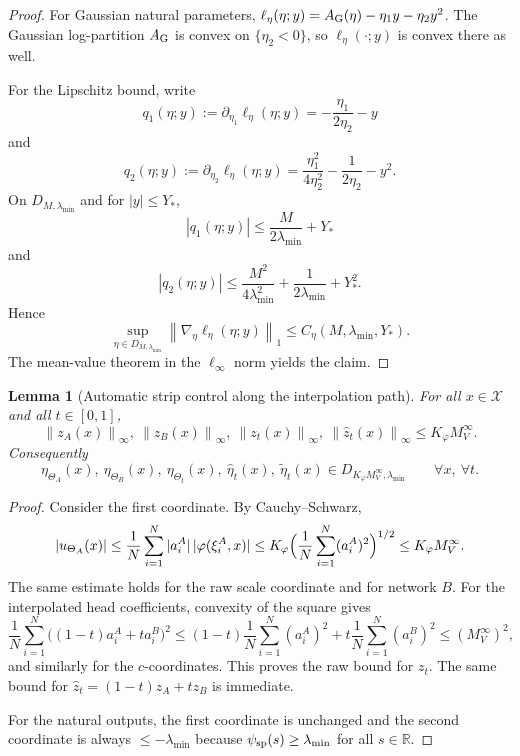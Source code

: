 \documentclass[11pt]{article}
\newtheorem{lemma}[theorem]{Lemma}
\theoremstyle{definition}
\newcommand{\R}{\mathbb{R}}
\newcommand{\norm}[1]{\left\lVert #1 \right\rVert}
\newcommand{\mc}[1]{\mathcal{#1}}
\begin{document}
\begin{proof}
For Gaussian natural parameters, $\ell_\eta(\eta;y)=A_{\rm G}(\eta)-\eta_1y-\eta_2y^2$.
The Gaussian log-partition $A_{\rm G}$ is convex on $\{\eta_2<0\}$, so
$\ell_\eta(\cdot;y)$ is convex there as well.

For the Lipschitz bound, write
\[
  q_1(\eta;y):=\partial_{\eta_1}\ell_\eta(\eta;y)
  =
  -\frac{\eta_1}{2\eta_2}-y
\]
and
\[
  q_2(\eta;y):=\partial_{\eta_2}\ell_\eta(\eta;y)
  =
  \frac{\eta_1^2}{4\eta_2^2}
  -
  \frac1{2\eta_2}
  -
  y^2.
\]
On $D_{M,\lambda_{\min}}$ and for $|y|\le Y_\ast$,
\[
  |q_1(\eta;y)|
  \le
  \frac{M}{2\lambda_{\min}} + Y_\ast
\]
and
\[
  |q_2(\eta;y)|
  \le
  \frac{M^2}{4\lambda_{\min}^2}
  +
  \frac1{2\lambda_{\min}}
  +
  Y_\ast^2.
\]
Hence
\[
  \sup_{\eta\in D_{M,\lambda_{\min}}}
  \norm{\nabla_\eta \ell_\eta(\eta;y)}_1
  \le
  C_\eta(M,\lambda_{\min},Y_\ast).
\]
The mean-value theorem in the $\ell_\infty$ norm yields the claim.
\end{proof}

\begin{lemma}[Automatic strip control along the interpolation path]
\label{lem:auto_strip}
For all $x\in\mc{X}$ and all $t\in[0,1]$,
\[
  \norm{z_A(x)}_\infty,\ \norm{z_B(x)}_\infty,\ \norm{z_t(x)}_\infty,\
  \norm{\hat z_t(x)}_\infty
  \le
  K_\varphi M_V^\infty.
\]
Consequently
\[
  \eta_{\Theta_A}(x),\ \eta_{\Theta_B}(x),\ \eta_{\Theta_t}(x),\
  \hat\eta_t(x),\ \tilde\eta_t(x)
  \in
  D_{K_\varphi M_V^\infty,\lambda_{\min}}
  \qquad
  \forall x,\ \forall t.
\]
\end{lemma}

\begin{proof}
Consider the first coordinate. By Cauchy--Schwarz,
\[
  |u_{\Theta_A}(x)|
  \le
  \frac1N\sum_{i=1}^N |a_i^A|\,|\varphi(\xi_i^A,x)|
  \le
  K_\varphi
  \Bigl(\frac1N\sum_{i=1}^N (a_i^A)^2\Bigr)^{1/2}
  \le
  K_\varphi M_V^\infty.
\]
The same estimate holds for the raw scale coordinate and for network $B$.
For the interpolated head coefficients, convexity of the square gives
\[
  \frac1N\sum_{i=1}^N \bigl((1-t)a_i^A+ta_i^B\bigr)^2
  \le
  (1-t)\frac1N\sum_{i=1}^N (a_i^A)^2
  +
  t\frac1N\sum_{i=1}^N (a_i^B)^2
  \le
  (M_V^\infty)^2,
\]
and similarly for the $c$-coordinates. This proves the raw bound for $z_t$.
The same bound for $\hat z_t=(1-t)z_A+tz_B$ is immediate.

For the natural outputs, the first coordinate is unchanged and the second
coordinate is always $\le -\lambda_{\min}$ because
$\psi_{\rm sp}(s)\ge \lambda_{\min}$ for all $s\in\R$.
\end{proof}
\end{document}
